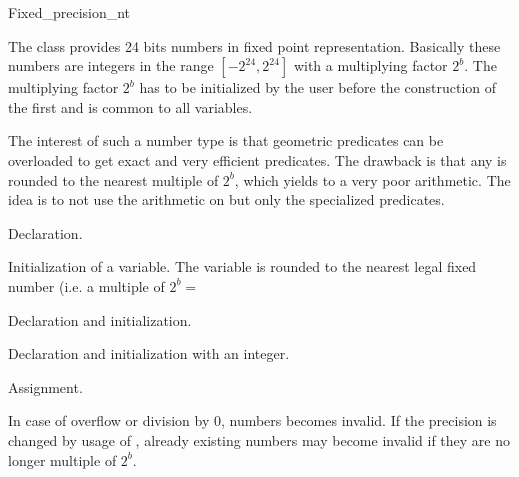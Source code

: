 \begin{ccClass}{Fixed_precision_nt}

\label{I1_Chapter_Fixed_precision_nt}

The class  provides 24 bits numbers in 
fixed point representation.
Basically these numbers are integers in the range
$[-2^{24},2^{24}]$ with a multiplying factor $2^b$.
The multiplying factor $2^b$ has to be initialized by the user
before the construction of the first 
and is common to all variables.

The interest of such a number type is that geometric predicates
can be overloaded to get exact and very efficient predicates.
The drawback is that any  is rounded to 
the nearest multiple of $2^b$, which yields to a very poor arithmetic.
The idea is to not use the arithmetic on 
but only the specialized predicates.


\ccSetTwoColumns{}{\hspace*{8.5cm}}

\ccCreation
{}


            {Declaration.}

            {Initialization of a variable. The variable is rounded to the
                nearest legal fixed number (i.e. a multiple of $2^b=$
                }


            {Declaration and initialization.}


            {Declaration and initialization with an integer.}

\ccOperations


        {Assignment. 
}

{In case of overflow or division by 0, numbers becomes invalid.
If the precision is changed by usage of 
, already existing numbers may become invalid
if they are no longer multiple of $2^b$.}


\end{ccClass}
